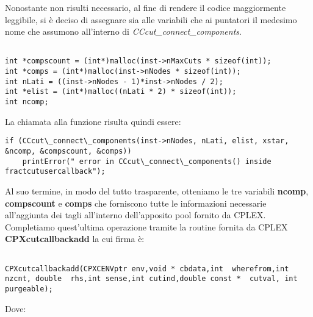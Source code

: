 \documentclass[11pt]{article}
\begin{document}
Nonostante non risulti necessario, al fine di rendere il codice maggiormente leggibile, si è deciso di assegnare sia alle variabili che ai puntatori il medesimo nome che assumono all’interno di \textit{CCcut\_connect\_components}.

\begin{lstlisting}

int *compscount = (int*)malloc(inst->nMaxCuts * sizeof(int));
int *comps = (int*)malloc(inst->nNodes * sizeof(int));
int nLati = ((inst->nNodes - 1)*inst->nNodes / 2);
int *elist = (int*)malloc((nLati * 2) * sizeof(int));
int ncomp; 

\end{lstlisting}

La chiamata alla funzione risulta quindi essere:

\begin{lstlisting}
if (CCcut\_connect\_components(inst->nNodes, nLati, elist, xstar, &ncomp, &compscount, &comps))
    printError(" error in CCcut\_connect\_components() inside fractcutusercallback");
\end{lstlisting}

Al suo termine, in modo del tutto trasparente, otteniamo le tre variabili \textbf{ncomp}, \textbf{compscount} e \textbf{comps} che forniscono tutte le informazioni necessarie all'aggiunta dei tagli all'interno dell'apposito pool fornito da CPLEX.
Completiamo quest'ultima operazione tramite la routine fornita da CPLEX \textbf{CPXcutcallbackadd} la cui firma è:

\begin{lstlisting}

CPXcutcallbackadd(CPXCENVptr env,void * cbdata,int  wherefrom,int  nzcnt, double  rhs,int sense,int cutind,double const *  cutval, int purgeable);

\end{lstlisting}

Dove:
\end{document}
